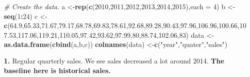 \documentclass[]{book}
\newenvironment{Shaded}{\begin{snugshade}}{\end{snugshade}}
\newcommand{\CommentTok}[1]{\textcolor[rgb]{0.56,0.35,0.01}{\textit{#1}}}
\newcommand{\DataTypeTok}[1]{\textcolor[rgb]{0.13,0.29,0.53}{#1}}
\newcommand{\DecValTok}[1]{\textcolor[rgb]{0.00,0.00,0.81}{#1}}
\newcommand{\FloatTok}[1]{\textcolor[rgb]{0.00,0.00,0.81}{#1}}
\newcommand{\KeywordTok}[1]{\textcolor[rgb]{0.13,0.29,0.53}{\textbf{#1}}}
\newcommand{\NormalTok}[1]{#1}
\newcommand{\OperatorTok}[1]{\textcolor[rgb]{0.81,0.36,0.00}{\textbf{#1}}}
\newcommand{\StringTok}[1]{\textcolor[rgb]{0.31,0.60,0.02}{#1}}
\begin{document}
\begin{Shaded}
\begin{Highlighting}[]
\CommentTok{# Create the data.}
\NormalTok{a <-}\KeywordTok{rep}\NormalTok{(}\KeywordTok{c}\NormalTok{(}\DecValTok{2010}\NormalTok{,}\DecValTok{2011}\NormalTok{,}\DecValTok{2012}\NormalTok{,}\DecValTok{2013}\NormalTok{,}\DecValTok{2014}\NormalTok{,}\DecValTok{2015}\NormalTok{),}\DataTypeTok{each =} \DecValTok{4}\NormalTok{)}
\NormalTok{b <-}\StringTok{ }\KeywordTok{seq}\NormalTok{(}\DecValTok{1}\OperatorTok{:}\DecValTok{24}\NormalTok{)}
\NormalTok{c <-}\StringTok{ }\KeywordTok{c}\NormalTok{(}\FloatTok{64.9}\NormalTok{,}\FloatTok{65.33}\NormalTok{,}\FloatTok{71.67}\NormalTok{,}\FloatTok{79.17}\NormalTok{,}\FloatTok{68.78}\NormalTok{,}\FloatTok{69.83}\NormalTok{,}\FloatTok{78.61}\NormalTok{,}\FloatTok{92.68}\NormalTok{,}\FloatTok{89.28}\NormalTok{,}\FloatTok{90.43}\NormalTok{,}\FloatTok{97.96}\NormalTok{,}\FloatTok{106.96}\NormalTok{,}\FloatTok{100.66}\NormalTok{,}\FloatTok{107.53}\NormalTok{,}\FloatTok{117.06}\NormalTok{,}\FloatTok{119.21}\NormalTok{,}\FloatTok{110.05}\NormalTok{,}\FloatTok{97.42}\NormalTok{,}\FloatTok{93.62}\NormalTok{,}\FloatTok{97.99}\NormalTok{,}\DecValTok{80}\NormalTok{,}\FloatTok{88.74}\NormalTok{,}\FloatTok{102.06}\NormalTok{,}\DecValTok{83}\NormalTok{)}
\NormalTok{data <-}\StringTok{ }\KeywordTok{as.data.frame}\NormalTok{(}\KeywordTok{cbind}\NormalTok{(a,b,c))}
\KeywordTok{colnames}\NormalTok{(data) <-}\KeywordTok{c}\NormalTok{(}\StringTok{"year"}\NormalTok{,}\StringTok{"quater"}\NormalTok{,}\StringTok{"sales"}\NormalTok{)}
\end{Highlighting}
\end{Shaded}

\textbf{1.} Regular quarterly sales. We see sales decreased a lot around 2014. \textbf{The baseline here is historical sales.}

\begin{Shaded}
\end{Shaded}
\end{document}
